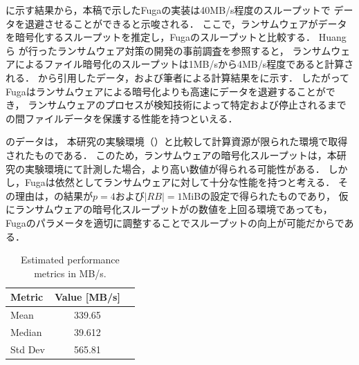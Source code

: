 に示す結果から，本稿で示したFugaの実装は40MB/s程度のスループットで
データを退避させることができると示唆される．
ここで，ランサムウェアがデータを暗号化するスループットを推定し，Fugaのスループットと比較する．
Huangら \cite{huang2017flashguard} が行ったランサムウェア対策の開発の事前調査を参照すると，
ランサムウェアによるファイル暗号化のスループットは1MB/sから4MB/s程度であると計算される．
\cite{huang2017flashguard}から引用したデータ，および筆者による計算結果をに示す．
したがってFugaはランサムウェアによる暗号化よりも高速にデータを退避することができ，
ランサムウェアのプロセスが検知技術によって特定および停止されるまでの間ファイルデータを保護する性能を持つといえる．

のデータは，
本研究の実験環境（）と比較して計算資源が限られた環境で取得されたものである．
このため，ランサムウェアの暗号化スループットは，本研究の実験環境にて計測した場合，より高い数値が得られる可能性がある．
しかし，Fugaは依然としてランサムウェアに対して十分な性能を持つと考える．
その理由は，の結果が$p = 4$および$|RB| = 1$MiBの設定で得られたものであり，
仮にランサムウェアの暗号化スループットがの数値を上回る環境であっても，
Fugaのパラメータを適切に調整することでスループットの向上が可能だからである．


\begin{table}[t]
  \centering
  \caption{Estimated performance metrics in MB/s.}
  \begin{tabular}{lcc}
    \hline
    Metric  & Value [MB/s] \\
    \hline
    Mean    & 339.65       \\
    Median  & 39.612       \\
    Std Dev & 565.81       \\
    \hline
  \end{tabular}
  \label{tab:performance_metrics}
\end{table}


